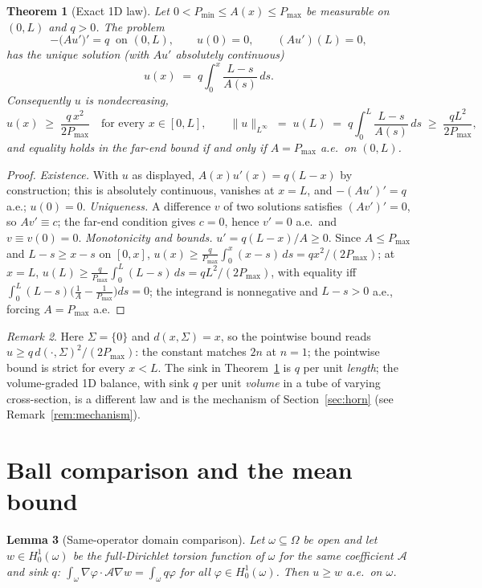 \documentclass[10pt]{article}
\newtheorem{theorem}{Theorem}[section]
\newtheorem{lemma}[theorem]{Lemma}
\theoremstyle{remark}
\newtheorem{remark}[theorem]{Remark}
\newcommand{\A}{\mathcal{A}}
\newcommand{\Om}{\Omega}
\newcommand{\Sig}{\Sigma}
\newcommand{\Pmax}{P_{\max}}
\newcommand{\Pmin}{P_{\min}}
\newcommand{\norminf}[1]{\|#1\|_{L^\infty}}
\begin{document}
\begin{theorem}[Exact 1D law]\label{thm:oned}
Let $0<\Pmin\le A(x)\le\Pmax$ be measurable on $(0,L)$ and $q>0$. The problem
\[
-\bigl(A u'\bigr)'=q\ \text{ on }(0,L),\qquad u(0)=0,\qquad (Au')(L)=0,
\]
has the unique solution (with $Au'$ absolutely continuous)
\[
u(x)\;=\;q\int_0^x \frac{L-s}{A(s)}\,ds .
\]
Consequently $u$ is nondecreasing,
\[
u(x)\;\ge\;\frac{q\,x^2}{2\Pmax}\quad\text{for every }x\in[0,L],
\qquad
\norminf{u}\;=\;u(L)\;=\;q\int_0^L\frac{L-s}{A(s)}\,ds\;\ge\;\frac{qL^2}{2\Pmax},
\]
and equality holds in the far-end bound if and only if $A=\Pmax$ a.e.\ on
$(0,L)$.
\end{theorem}

\begin{proof}
\emph{Existence.} With $u$ as displayed, $A(x)u'(x)=q(L-x)$ by construction;
this is absolutely continuous, vanishes at $x=L$, and $-(Au')'=q$ a.e.;
$u(0)=0$.
\emph{Uniqueness.} A difference $v$ of two solutions satisfies $(Av')'=0$, so
$Av'\equiv c$; the far-end condition gives $c=0$, hence $v'=0$ a.e.\ and
$v\equiv v(0)=0$.
\emph{Monotonicity and bounds.} $u'=q(L-x)/A\ge0$. Since $A\le\Pmax$ and
$L-s\ge x-s$ on $[0,x]$,
$u(x)\ge \tfrac{q}{\Pmax}\int_0^x(x-s)\,ds=qx^2/(2\Pmax)$; at $x=L$,
$u(L)\ge \tfrac{q}{\Pmax}\int_0^L(L-s)\,ds=qL^2/(2\Pmax)$, with equality iff
$\int_0^L(L-s)\bigl(\tfrac1A-\tfrac1{\Pmax}\bigr)ds=0$; the integrand is
nonnegative and $L-s>0$ a.e., forcing $A=\Pmax$ a.e.
\end{proof}

\begin{remark}\label{rem:onedconst}
Here $\Sig=\{0\}$ and $d(x,\Sig)=x$, so the pointwise bound reads
$u\ge q\,d(\cdot,\Sig)^2/(2\Pmax)$: the constant matches $2n$ at $n=1$; the
pointwise bound is strict for every $x<L$. The
sink in Theorem~\ref{thm:oned} is $q$ per unit \emph{length}; the
volume-graded 1D balance, with sink $q$ per unit \emph{volume} in a tube of
varying cross-section, is a different law and is the mechanism of
Section~\ref{sec:horn} (see Remark~\ref{rem:mechanism}).
\end{remark}

\section{Ball comparison and the mean bound}\label{sec:ball}

\begin{lemma}[Same-operator domain comparison]\label{lem:compare}
Let $\omega\subseteq\Om$ be open and let $w\in H^1_0(\omega)$ be the
full-Dirichlet torsion function of $\omega$ for the \emph{same} coefficient
$\A$ and sink $q$:
$\int_\omega\nabla\varphi\cdot\A\nabla w=\int_\omega q\varphi$ for all
$\varphi\in H^1_0(\omega)$. Then $u\ge w$ a.e.\ on $\omega$.
\end{lemma}
\end{document}
